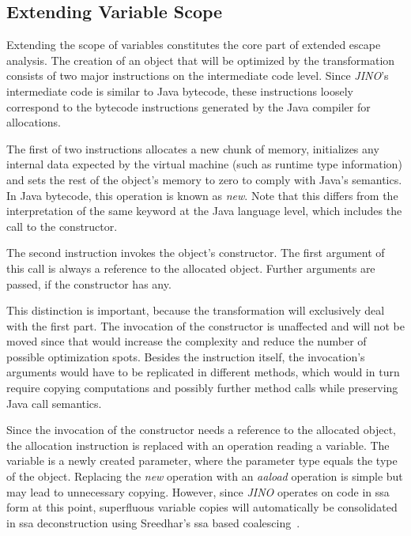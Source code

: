 		\subsection{Extending Variable Scope}
			\label{sub:eea:opt:scopeext}
			Extending the scope of variables constitutes the core part of extended escape analysis. The creation of an object
			that will be optimized by the transformation consists of two major instructions on the intermediate code level.
			Since \emph{JINO}'s intermediate code is similar to Java bytecode, these instructions loosely correspond to the
			bytecode instructions generated by the Java compiler for allocations.

			The first of two instructions allocates a new chunk of memory, initializes any internal data expected by the
			virtual machine (such as runtime type information) and sets the rest of the object's memory to zero to comply with
			Java's semantics. In Java bytecode, this operation is known as \emph{new}. Note that this differs from the
			interpretation of the same keyword at the Java language level, which includes the call to the constructor.

			The second instruction invokes the object's constructor. The first argument of this call is always a reference to
			the allocated object. Further arguments are passed, if the constructor has any.

			This distinction is important, because the transformation will exclusively deal with the first part. The
			invocation of the constructor is unaffected and will not be moved since that would increase the complexity and
			reduce the number of possible optimization spots. Besides the instruction itself, the invocation's arguments would
			have to be replicated in different methods, which would in turn require copying computations and possibly further
			method calls while preserving Java call semantics.

			Since the invocation of the constructor needs a reference to the allocated object, the allocation instruction is
			replaced with an operation reading a variable. The variable is a newly created parameter, where the parameter type
			equals the type of the object. Replacing the \emph{new} operation with an \emph{aaload} operation is simple but
			may lead to unnecessary copying. However, since \emph{JINO} operates on code in \gls{ssa} form at this point,
			superfluous variable copies will automatically be consolidated in \gls{ssa} deconstruction using Sreedhar's
			\gls{ssa} based coalescing~\cite{sreedhar:99:sas}.

